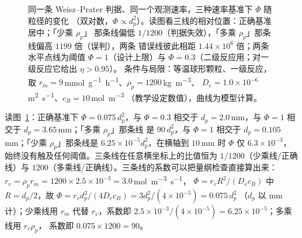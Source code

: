 \begin{figure}[htbp]
\centering
{}
\caption{同一条 Weisz--Prater 判据、同一个观测速率，三种速率基准下 $\Phi$ 随粒径的变化
（双对数，$\Phi\propto d_p^{2}$）。读图看三线的相对位置：正确基准居中；「少乘 $\rho_p$」
那条线偏低 $1/1200$（判据失效），「多乘 $\rho_p$」那条线偏高 $1199$ 倍（误判），两条
错误线彼此相距 $1.44\times10^{6}$ 倍；两条水平点线为阈值 $\Phi=1$（设计上限）与
$\Phi=0.3$（二级反应用；对一级反应它给出 $\eta>0.95$）。
条件与局限：等温球形颗粒、一级反应，取
$r_m=9$\,\unit{mmol.g^{-1}.h^{-1}}、$\rho_p=1200$\,\unit{kg.m^{-3}}、
$D_e=1.0\times10^{-6}$\,\unit{m^2.s^{-1}}、$c_B=10$\,\unit{mol.m^{-3}}
（教学设定数值），曲线为模型计算。\modelmark}
\label{fig:ch10-wp}
\end{figure}

\begin{obs}
读图~\ref{fig:ch10-wp}：正确基准下 $\Phi=0.075\,d_p^{2}$，与 $\Phi=0.3$ 相交于
$d_p=2.0$\,\unit{mm}，与 $\Phi=1$ 相交于 $d_p=3.65$\,\unit{mm}；「多乘 $\rho_p$」那条线
是 $90\,d_p^{2}$，与 $\Phi=1$ 相交于 $d_p=0.105$\,\unit{mm}；「少乘 $\rho_p$」那条线是
$6.25\times10^{-5}d_p^{2}$，在横轴到 $10$\,\unit{mm} 时 $\Phi$ 仅 $6.3\times10^{-3}$，
始终没有触及任何阈值。三条线在任意横坐标上的比值恒为 $1/1200$（少乘线/正确线）与
$1200$（多乘线/正确线）。三条线的系数可以把量纲检查直接算出来：$r_v=\rho_pr_m
=1200\times2.5\times10^{-3}=3.0$\,\unit{mol.m^{-3}.s^{-1}}，
$\Phi=r_vR^{2}/(D_ec_B)$ 中 $R=d_p/2$，故
$\Phi=r_vd_p^{2}/(4D_ec_B)=3d_p^{2}/(4\times10^{-5})=0.075\,d_p^{2}$
（$d_p$ 以 \unit{mm} 计）；少乘线用 $r_m$ 代替 $r_v$，系数即
$2.5\times10^{-3}/(4\times10^{-5})=6.25\times10^{-5}$；多乘线用 $r_v\rho_p$，
系数即 $0.075\times1200=90$。
\end{obs}

